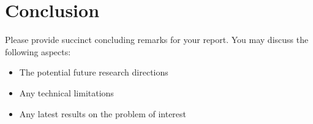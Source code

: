 \section{Conclusion}
\label{section:conclusion}
Please provide succinct concluding remarks for your report. You may discuss the following aspects:
\begin{itemize}
    \item The potential future research directions
    \item Any technical limitations
    \item Any latest results on the problem of interest
\end{itemize}